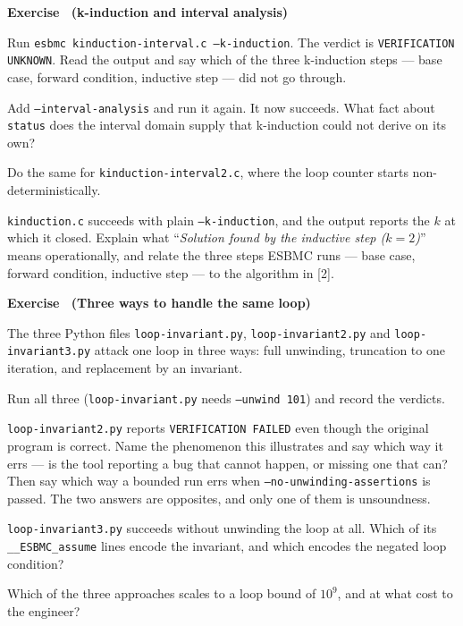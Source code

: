 \documentclass[11pt,a4paper]{article}
\newcommand{\esbmc}{ESBMC}
\newcommand{\flag}[1]{\texttt{\small #1}}
\newcommand{\file}[1]{\texttt{\small #1}}
\newcounter{exc}
\renewcommand{\theexc}{\arabic{exc}}
\newenvironment{exercise}[2][]
  {\stepcounter{exc}\ifx\relax#1\relax\else\excref{#1}\fi%
   \medskip\noindent\textbf{Exercise \theexc\ (#2)}\par\nopagebreak\smallskip}
  {\par\medskip}
\begin{document}
\begin{exercise}{k-induction and interval analysis}
\begin{parts}
  \item Run \texttt{esbmc kinduction-interval.c --k-induction}. The verdict is
        \texttt{VERIFICATION UNKNOWN}. Read the output and say which of the
        three k-induction steps --- base case, forward condition, inductive
        step --- did not go through.
  \item Add \flag{--interval-analysis} and run it again. It now succeeds. What
        fact about \texttt{status} does the interval domain supply that
        k-induction could not derive on its own?
  \item Do the same for \file{kinduction-interval2.c}, where the loop counter
        starts non-deterministically.
  \item \file{kinduction.c} succeeds with plain \flag{--k-induction}, and the
        output reports the $k$ at which it closed. Explain what
        ``\emph{Solution found by the inductive step ($k = 2$)}'' means
        operationally, and relate the three steps \esbmc{} runs --- base case,
        forward condition, inductive step --- to the algorithm in [2].
\end{parts}
\end{exercise}

\begin{exercise}{Three ways to handle the same loop}
The three Python files \file{loop-invariant.py}, \file{loop-invariant2.py} and
\file{loop-invariant3.py} attack one loop in three ways: full unwinding,
truncation to one iteration, and replacement by an invariant.

\begin{parts}
  \item Run all three (\file{loop-invariant.py} needs \flag{--unwind 101}) and
        record the verdicts.
  \item \file{loop-invariant2.py} reports \texttt{VERIFICATION FAILED} even
        though the original program is correct. Name the phenomenon this
        illustrates and say which way it errs --- is the tool reporting a bug
        that cannot happen, or missing one that can? Then say which way a
        bounded run errs when \flag{--no-unwinding-assertions} is passed. The
        two answers are opposites, and only one of them is unsoundness.
  \item \file{loop-invariant3.py} succeeds without unwinding the loop at all.
        Which of its \texttt{\_\_ESBMC\_assume} lines encode the invariant, and
        which encodes the negated loop condition?
  \item Which of the three approaches scales to a loop bound of $10^9$, and at
        what cost to the engineer?
\end{parts}
\end{exercise}
\end{document}
